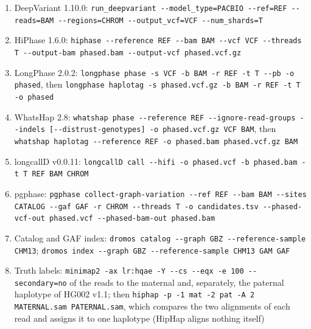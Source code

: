 \documentclass[10pt]{article}
\begin{document}
\begin{enumerate}
  \item DeepVariant 1.10.0: \texttt{run\_deepvariant -{}-model\_type=PACBIO -{}-ref=REF -{}-reads=BAM -{}-regions=CHROM -{}-output\_vcf=VCF -{}-num\_shards=T}
  \item HiPhase 1.6.0: \texttt{hiphase -{}-reference REF -{}-bam BAM -{}-vcf VCF -{}-threads T -{}-output-bam phased.bam -{}-output-vcf phased.vcf.gz}
  \item LongPhase 2.0.2: \texttt{longphase phase -s VCF -b BAM -r REF -t T -{}-pb -o phased}, then \texttt{longphase haplotag -s phased.vcf.gz -b BAM -r REF -t T -o phased}
  \item WhatsHap 2.8: \texttt{whatshap phase -{}-reference REF -{}-ignore-read-groups -{}-indels [-{}-distrust-genotypes] -o phased.vcf.gz VCF BAM}, then \texttt{whatshap haplotag -{}-reference REF -o phased.bam phased.vcf.gz BAM}
  \item longcallD v0.0.11: \texttt{longcallD call -{}-hifi -o phased.vcf -b phased.bam -t T REF BAM CHROM}
  \item pgphase: \texttt{pgphase collect-graph-variation -{}-ref REF -{}-bam BAM -{}-sites CATALOG -{}-gaf GAF -r CHROM -{}-threads T -o candidates.tsv -{}-phased-vcf-out phased.vcf -{}-phased-bam-out phased.bam}
  \item Catalog and GAF index: \texttt{dromos catalog -{}-graph GBZ -{}-reference-sample CHM13}; \texttt{dromos index -{}-graph GBZ -{}-reference-sample CHM13 GAM GAF}
  \item Truth labels: \texttt{minimap2 -ax lr:hqae -Y -{}-cs -{}-eqx -e 100 -{}-secondary=no} of the reads to the maternal and, separately, the paternal haplotype of HG002 v1.1; then \texttt{hiphap -p -1 mat -2 pat -A 2 MATERNAL.sam PATERNAL.sam}, which compares the two alignments of each read and assigns it to one haplotype (HipHap aligns nothing itself)
\end{enumerate}
\end{document}

